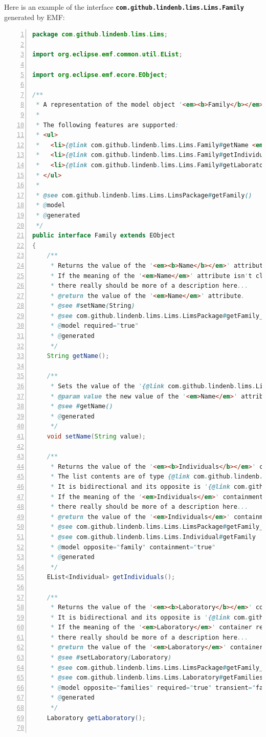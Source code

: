 \documentclass{article}
\begin{document}
Here is an example of the interface \textbf{\texttt{com.github.lindenb.lims.Lims.Family}} generated by EMF:
\begin{lstlisting}[language=java,basicstyle=\tiny,breaklines=true,numbers=left]
package com.github.lindenb.lims.Lims;

import org.eclipse.emf.common.util.EList;

import org.eclipse.emf.ecore.EObject;

/**
 * A representation of the model object '<em><b>Family</b></em>'.
 *
 * The following features are supported:
 * <ul>
 *   <li>{@link com.github.lindenb.lims.Lims.Family#getName <em>Name</em>}</li>
 *   <li>{@link com.github.lindenb.lims.Lims.Family#getIndividuals <em>Individuals</em>}</li>
 *   <li>{@link com.github.lindenb.lims.Lims.Family#getLaboratory <em>Laboratory</em>}</li>
 * </ul>
 *
 * @see com.github.lindenb.lims.Lims.LimsPackage#getFamily()
 * @model
 * @generated
 */
public interface Family extends EObject
{
	/**
	 * Returns the value of the '<em><b>Name</b></em>' attribute.
	 * If the meaning of the '<em>Name</em>' attribute isn't clear,
	 * there really should be more of a description here...
	 * @return the value of the '<em>Name</em>' attribute.
	 * @see #setName(String)
	 * @see com.github.lindenb.lims.Lims.LimsPackage#getFamily_Name()
	 * @model required="true"
	 * @generated
	 */
	String getName();

	/**
	 * Sets the value of the '{@link com.github.lindenb.lims.Lims.Family#getName <em>Name</em>}' attribute.
	 * @param value the new value of the '<em>Name</em>' attribute.
	 * @see #getName()
	 * @generated
	 */
	void setName(String value);

	/**
	 * Returns the value of the '<em><b>Individuals</b></em>' containment reference list.
	 * The list contents are of type {@link com.github.lindenb.lims.Lims.Individual}.
	 * It is bidirectional and its opposite is '{@link com.github.lindenb.lims.Lims.Individual#getFamily <em>Family</em>}'.
	 * If the meaning of the '<em>Individuals</em>' containment reference list isn't clear,
	 * there really should be more of a description here...
	 * @return the value of the '<em>Individuals</em>' containment reference list.
	 * @see com.github.lindenb.lims.Lims.LimsPackage#getFamily_Individuals()
	 * @see com.github.lindenb.lims.Lims.Individual#getFamily
	 * @model opposite="family" containment="true"
	 * @generated
	 */
	EList<Individual> getIndividuals();

	/**
	 * Returns the value of the '<em><b>Laboratory</b></em>' container reference.
	 * It is bidirectional and its opposite is '{@link com.github.lindenb.lims.Lims.Laboratory#getFamilies <em>Families</em>}'.
	 * If the meaning of the '<em>Laboratory</em>' container reference isn't clear,
	 * there really should be more of a description here...
	 * @return the value of the '<em>Laboratory</em>' container reference.
	 * @see #setLaboratory(Laboratory)
	 * @see com.github.lindenb.lims.Lims.LimsPackage#getFamily_Laboratory()
	 * @see com.github.lindenb.lims.Lims.Laboratory#getFamilies
	 * @model opposite="families" required="true" transient="false"
	 * @generated
	 */
	Laboratory getLaboratory();


\end{lstlisting}
\end{document}
